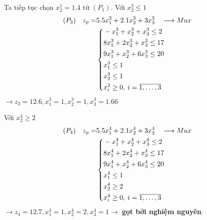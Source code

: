 \documentclass[12pt,a4paper]{report}
\begin{document}
    
    
      Ta tiếp tục chọn $x^1_2=1.4$ từ $(P_1)$. Với $x^3_2 \leq 1$
    \begin{equation*}
      \begin{split}
          (P_3) \quad z_p= & 5.5x^3_1 + 2.1x^3_2 + 3x^3_3 \quad \longrightarrow Max \\
          & \left\{\begin{split}
          & -x^3_1 + x^3_2 + x^3_3 \leq 2 \\
          & 8x^3_1 + 2x^3_2 + x^3_3\leq 17 \\
          & 9x^3_1 + x^3_2 + 6x^3_3 \leq 20 \\
          & x^3_1 \leq 1 \\
          & x^3_2 \leq 1 \\
          &x^3_i \geq 0 , \: i=\overline{\rm 1, \ldots ,3} \\
          \end{split}\right. \\
      \end{split}
    \end{equation*}
    $\rightarrow z_3=12.6, x^3_1=1, x^3_2=1, x^3_3=1.66$
    
    
    
     Với $x^4_2 \geq 2$
    \begin{equation*}
      \begin{split}
          (P_4) \quad z_p= & 5.5x^4_1 + 2.1x^4_2 + 3x^4_3 \quad \longrightarrow Max \\
          & \left\{\begin{split}
          & -x^4_1 + x^4_2 + x^4_3 \leq 2 \\
          & 8x^4_1 + 2x^4_2 + x^4_3\leq 17 \\
          & 9x^4_1 + x^4_2 + 6x^4_3 \leq 20 \\
          & x^4_1 \leq 1 \\
          & x^4_2 \geq 2 \\
          &x^4_i \geq 0 , \: i=\overline{\rm 1, \ldots ,3} \\
          \end{split}\right. \\
      \end{split}
    \end{equation*}
    $\rightarrow z_4=12.7, x^4_1=1, x^4_2=2, x^4_3=1 \rightarrow$ \textbf{gọt bởi nghiệm nguyên}.
    
    
    
\end{document}
